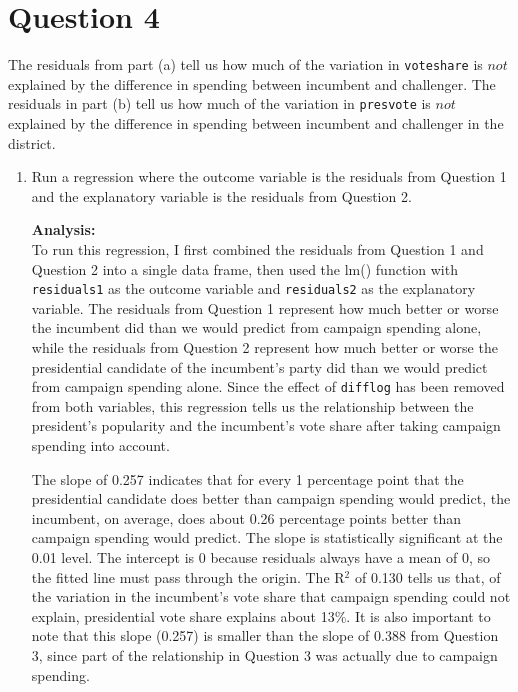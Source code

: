 \documentclass[12pt,letterpaper]{article}
\begin{document}
\section*{Question 4}
\noindent The residuals from part (a) tell us how much of the variation in \texttt{voteshare} is $not$ explained by the difference in spending between incumbent and challenger. The residuals in part (b) tell us how much of the variation in \texttt{presvote} is $not$ explained by the difference in spending between incumbent and challenger in the district.
	\begin{enumerate}
		\item Run a regression where the outcome variable is the residuals from Question 1 and the explanatory variable is the residuals from Question 2.
		
		
		
		
		\textbf{Analysis:}\\
		To run this regression, I first combined the residuals from Question 1 and Question 2 into a single data frame, then used the lm() function with \texttt{residuals1} as the outcome variable and \texttt{residuals2} as the explanatory variable. The residuals from Question 1 represent how much better or worse the incumbent did than we would predict from campaign spending alone, while the residuals from Question 2 represent how much better or worse the presidential candidate of the incumbent's party did than we would predict from campaign spending alone. Since the effect of \texttt{difflog} has been removed from both variables, this regression tells us the relationship between the president's popularity and the incumbent's vote share after taking campaign spending into account.
		
		The slope of 0.257 indicates that for every 1 percentage point that the presidential candidate does better than campaign spending would predict, the incumbent, on average, does about 0.26 percentage points better than campaign spending would predict. The slope is statistically significant at the 0.01 level. The intercept is 0 because residuals always have a mean of 0, so the fitted line must pass through the origin. The R$^2$ of 0.130 tells us that, of the variation in the incumbent's vote share that campaign spending could not explain, presidential vote share explains about 13\%. It is also important to note that this slope (0.257) is smaller than the slope of 0.388 from Question 3, since part of the relationship in Question 3 was actually due to campaign spending.
		

\end{enumerate}
\end{document}
